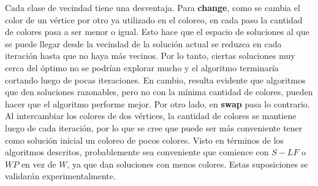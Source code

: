 Cada clase de vecindad tiene una desventaja. Para \textbf{change}, como se cambia el color de un vértice por otro ya utilizado en el coloreo, en cada paso la cantidad de colores pasa a ser menor o igual. Esto hace que el espacio de soluciones al que se puede llegar desde la vecindad de la solución actual se reduzca en cada iteración hasta que no haya más vecinos. Por lo tanto, ciertas soluciones muy cerca del óptimo no se podrían explorar mucho y el algoritmo terminaría cortando luego de pocas iteraciones. En cambio, resulta evidente que algoritmos que den soluciones razonables, pero no con la mínima cantidad de colores, pueden hacer que el algoritmo performe mejor. Por otro lado, en \textbf{swap} pasa lo contrario. Al intercambiar los colores de dos vértices, la cantidad de colores se mantiene luego de cada iteración, por lo que se cree que puede ser más conveniente tener como solución inicial un coloreo de pocos colores. Visto en términos de los algoritmos descritos, probablemente sea conveniente que comience con $S-LF$ o $WP$ en vez de $W$, ya que dan soluciones con menos colores. Estas suposiciones se validarán experimentalmente.